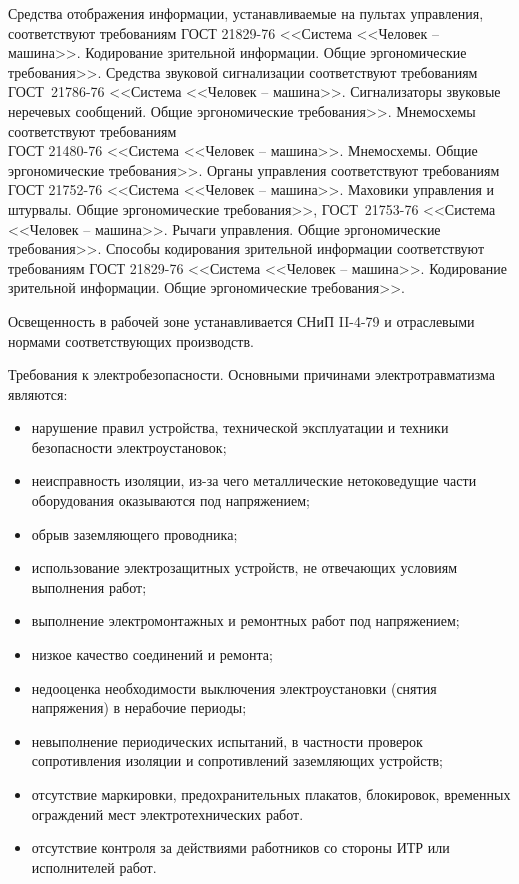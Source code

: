         Средства отображения информации, устанавливаемые на пультах управления,
        соответствуют требованиям ГОСТ 21829-76 <<Система <<Человек – машина>>.
        Кодирование зрительной информации. Общие эргономические требования>>.
        Средства звуковой сигнализации соответствуют требованиям ГОСТ\ 21786-76
        <<Система <<Человек – машина>>. Сигнализаторы звуковые неречевых
        сообщений. Общие эргономические требования>>.  Мнемосхемы соответствуют
        требованиям\\ ГОСТ 21480-76 <<Система <<Человек – машина>>. Мнемосхемы.
        Общие эргономические требования>>. Органы управления соответствуют
        требованиям ГОСТ 21752-76 <<Система <<Человек – машина>>. Маховики
        управления и штурвалы. Общие эргономические требования>>, ГОСТ\ 21753-76
        <<Система <<Человек – машина>>. Рычаги управления.  Общие
        эргономические требования>>. Способы кодирования зрительной информации
        соответствуют требованиям ГОСТ 21829-76 <<Система <<Человек – машина>>.
        Кодирование зрительной информации. Общие эргономические требования>>.

        Освещенность в рабочей зоне устанавливается СНиП II-4-79 и отраслевыми
        нормами соответствующих производств.

        Требования к электробезопасности.
        Основными причинами электротравматизма являются:
        \begin{itemize}
            \item нарушение  правил устройства,  технической  эксплуатации и
                техники безопасности электроустановок;
            \item неисправность изоляции, из-за чего металлические
                нетоковедущие части оборудования оказываются под напряжением;
            \item обрыв заземляющего проводника;
            \item использование электрозащитных устройств, не отвечающих
                условиям выполнения работ;
            \item выполнение электромонтажных и ремонтных работ под напряжением;
            \item низкое качество соединений и ремонта;
            \item недооценка  необходимости  выключения электроустановки
                (снятия напряжения) в нерабочие периоды;
            \item невыполнение периодических испытаний, в частности проверок
                сопротивления изоляции и сопротивлений заземляющих устройств;
            \item отсутствие маркировки, предохранительных плакатов,
                блокировок, временных ограждений мест электротехнических работ.
            \item отсутствие контроля за действиями работников со стороны ИТР
                или исполнителей работ.
        \end{itemize}

